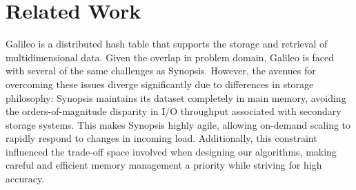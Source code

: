 \section{Related Work}
\label{sec:related}

Galileo \cite{} is a distributed hash table that supports the storage and retrieval of multidimensional data. Given the overlap in problem domain, Galileo is faced with several of the same challenges as Synopsis. However, the avenues for overcoming these issues diverge significantly due to differences in storage philosophy: Synopsis maintains its dataset completely in main memory, avoiding the orders-of-magnitude disparity in I/O throughput associated with secondary storage systems. This makes Synopsis highly agile, allowing on-demand scaling to rapidly respond to changes in incoming load. Additionally, this constraint influenced the trade-off space involved when designing our algorithms, making careful and efficient memory management a priority while striving for high accuracy.
